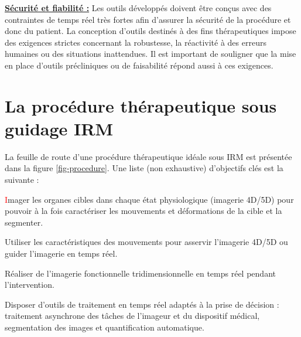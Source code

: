 \underline{\textbf{Sécurité et fiabilité :}} Les outils développés doivent être conçus avec des contraintes de temps réel très fortes afin d’assurer la sécurité de la procédure et donc du patient. La conception d’outils destinés à des fins thérapeutiques impose des exigences strictes concernant la robustesse, la réactivité à des erreurs humaines ou des situations inattendues. Il est important de souligner que la mise en place d’outils précliniques ou de faisabilité répond aussi à ces exigences.

\section{La procédure thérapeutique sous guidage IRM}

La feuille de route d’une procédure thérapeutique idéale sous IRM est présentée dans la figure \ref{fig-procedure}. Une liste (non exhaustive) d’objectifs clés est la suivante :


\begin{description}
\item \textcolor{red}{I}mager les organes cibles dans chaque état physiologique (imagerie 4D/5D) pour pouvoir à la fois caractériser les mouvements et déformations de la cible et la segmenter.
\item  Utiliser les caractéristiques des mouvements pour asservir l’imagerie 4D/5D ou guider l’imagerie en temps réel.
\item  Réaliser de l’imagerie fonctionnelle tridimensionnelle en temps réel pendant l’intervention.
\item  Disposer d’outils de traitement en temps réel adaptés à la prise de décision : traitement asynchrone des tâches de l’imageur et du dispositif médical, segmentation des images et quantification automatique.
\end{description}

